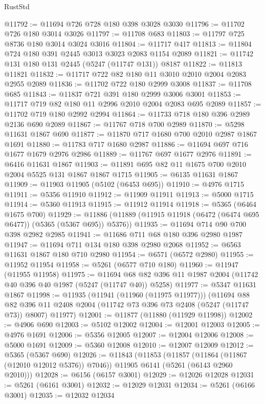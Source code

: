 \begin{lexlean}{RustStd}
\begin{coremodule}
@11792 := @11694 @726 @728 @180 @398 @3028 @3030
@11796 := @11702 @726 @180 @3014 @3026
@11797 := @11708 @683
@11803 := @11797 @725 @8736 @180 @3014 @3024 @3016
@11804 := @11717 @417
@11813 := @11804 @724 @180 @391 @2445 @3013 @3023 @2083 @1154 @2089
@11821 := @11742 @131 @180 @131 @2445 (@5247 (@11747 @131)) @8187
@11822 := @11813 @11821
@11832 := @11717 @722 @82 @180 @11 @3010 @2010 @2004 @2083 @2955 @2089
@11836 := @11702 @722 @180 @2999 @3008
@11837 := @11708 @685
@11843 := @11837 @721 @391 @180 @2999 @3006 @3001
@11853 := @11717 @719 @82 @180 @11 @2996 @2010 @2004 @2083 @695 @2089
@11857 := @11702 @719 @180 @2992 @2994
@11864 := @11733 @718 @180 @396 @2989 @2136 @690 @2089
@11867 := @11767 @718 @700 @2989
@11870 := @5298 @11631 @1867 @690
@11877 := @11870 @717 @1680 @700 @2010 @2987 @1867 @1691
@11880 := @11783 @717 @1680 @2987
@11886 := @11694 @697 @716 @1677 @1679 @2976 @2986
@11889 := @11767 @697 @1677 @2976
@11891 := @6416 @11631 @1867
@11903 := @11891 @695 @82 @11 @1675 @700 @2010 @2004 @5525 @131 @1867 @1867 @1715
@11905 := @6135 @11631 @1867
@11909 := @11903 @11905 (@5102 (@6453 @695))
@11910 := @4976 @1715
@11911 := @5356 @11910
@11912 := @11909 @11911
@11913 := @5000 @1715
@11914 := @5360 @11913
@11915 := @11912 @11914
@11918 := @5365 (@6464 @1675 @700)
@11929 := @11886 (@11889 (@11915 @11918 (@6472 (@6474 @695 @6477)) (@5365 (@5367 @695)) @5376))
@11935 := @11694 @714 @90 @700 @398 @2982 @2985
@11941 := @11686 @711 @68 @180 @396 @2980 @1987
@11947 := @11694 @711 @134 @180 @398 @2980 @2068
@11952 := @6563 @11631 @1867 @180 @710 @2980
@11954 := @6571 (@6572 @2980)
@11955 := @11952 @11954
@11958 := @5261 (@6577 @710 @180)
@11960 := @11947 (@11955 @11958)
@11975 := @11694 @68 @82 @396 @11 @1987 @2004 (@11742 @40 @396 @40 @1987 (@5247 (@11747 @40)) @5258)
@11977 := @5347 @11631 @1867
@11998 := @11935
    (@11941 (@11960 (@11975 @11977)))
    (@11694
      @88
      @82
      @396
      @11
      @2408
      @2004
      (@11742 @73 @396 @73 @2408 (@5247 (@11747 @73)) @8007)
      @11977)
@12001 := @11877 (@11880 (@11929 @11998))
@12002 := @4906 @690
@12003 := @5102 @12002
@12004 := @12001 @12003
@12005 := @4976 @1691
@12006 := @5356 @12005
@12007 := @12004 @12006
@12008 := @5000 @1691
@12009 := @5360 @12008
@12010 := @12007 @12009
@12012 := @5365 (@5367 @690)
@12026 := @11843
    (@11853
      (@11857 (@11864 (@11867 (@12010 @12012 @5376)) @7046))
      @11905
      @6141
      (@5261 (@6143 @2960 @2010)))
@12028 := @6156 (@6157 @3001)
@12029 := @12026 @12028
@12031 := @5261 (@6161 @3001)
@12032 := @12029 @12031
@12034 := @5261 (@6166 @3001)
@12035 := @12032 @12034

\end{coremodule}
\end{lexlean}

